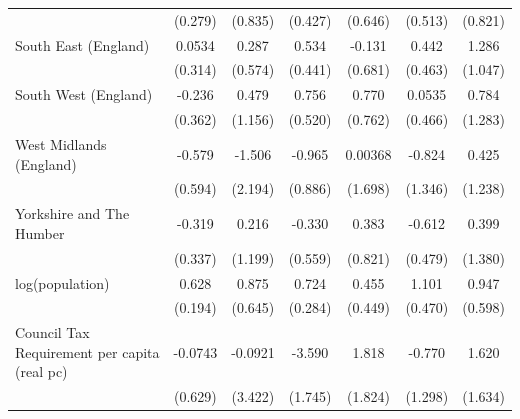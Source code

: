 \begin{table}[htbp]
\begin{tabular}{l*{6}{c}}
                    &     (0.279)         &     (0.835)         &     (0.427)         &     (0.646)         &     (0.513)         &     (0.821)         \\
\addlinespace
South East (England)&      0.0534         &       0.287         &       0.534         &      -0.131         &       0.442         &       1.286         \\
                    &     (0.314)         &     (0.574)         &     (0.441)         &     (0.681)         &     (0.463)         &     (1.047)         \\
\addlinespace
South West (England)&      -0.236         &       0.479         &       0.756         &       0.770         &      0.0535         &       0.784         \\
                    &     (0.362)         &     (1.156)         &     (0.520)         &     (0.762)         &     (0.466)         &     (1.283)         \\
\addlinespace
West Midlands (England)&      -0.579         &      -1.506         &      -0.965         &     0.00368         &      -0.824         &       0.425         \\
                    &     (0.594)         &     (2.194)         &     (0.886)         &     (1.698)         &     (1.346)         &     (1.238)         \\
\addlinespace
Yorkshire and The Humber&      -0.319         &       0.216         &      -0.330         &       0.383         &      -0.612         &       0.399         \\
                    &     (0.337)         &     (1.199)         &     (0.559)         &     (0.821)         &     (0.479)         &     (1.380)         \\
\addlinespace
log(population)     &       0.628\sym{***}&       0.875         &       0.724\sym{**} &       0.455         &       1.101\sym{**} &       0.947         \\
                    &     (0.194)         &     (0.645)         &     (0.284)         &     (0.449)         &     (0.470)         &     (0.598)         \\
\addlinespace
Council Tax Requirement per capita (real pc)&     -0.0743         &     -0.0921         &      -3.590\sym{**} &       1.818         &      -0.770         &       1.620         \\
                    &     (0.629)         &     (3.422)         &     (1.745)         &     (1.824)         &     (1.298)         &     (1.634)         \\

\end{tabular}
\end{table}

